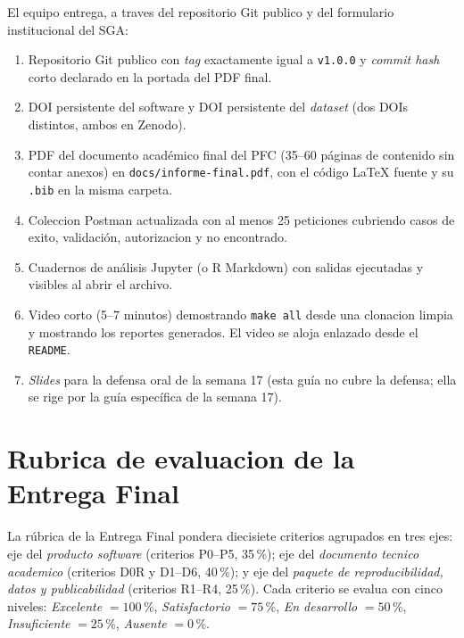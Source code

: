\documentclass[11pt,a4paper]{article}
\begin{document}
El equipo entrega, a traves del repositorio Git publico y del formulario institucional del SGA:

\begin{enumerate}
    \item Repositorio Git publico con \emph{tag} exactamente igual a \texttt{v1.0.0} y \emph{commit hash} corto declarado en la portada del PDF final.
    \item DOI persistente del software y DOI persistente del \emph{dataset} (dos DOIs distintos, ambos en Zenodo).
    \item PDF del documento acad\'{e}mico final del PFC (35--60 p\'{a}ginas de contenido sin contar anexos) en \texttt{docs/informe-final.pdf}, con el c\'{o}digo LaTeX fuente y su \texttt{.bib} en la misma carpeta.
    \item Coleccion Postman actualizada con al menos 25 peticiones cubriendo casos de exito, validaci\'{o}n, autorizacion y no encontrado.
    \item Cuadernos de an\'{a}lisis Jupyter (o R Markdown) con salidas ejecutadas y visibles al abrir el archivo.
    \item Video corto (5--7 minutos) demostrando \texttt{make all} desde una clonacion limpia y mostrando los reportes generados. El video se aloja enlazado desde el \texttt{README}.
    \item \emph{Slides} para la defensa oral de la semana 17 (esta gu\'{i}a no cubre la defensa; ella se rige por la gu\'{i}a espec\'{i}fica de la semana 17).
\end{enumerate}

\section{Rubrica de evaluacion de la Entrega Final}

La r\'{u}brica de la Entrega Final pondera diecisiete criterios agrupados en tres ejes: eje del \emph{producto software} (criterios P0--P5, 35\,\%); eje del \emph{documento tecnico academico} (criterios D0R y D1--D6, 40\,\%); y eje del \emph{paquete de reproducibilidad, datos y publicabilidad} (criterios R1--R4, 25\,\%). Cada criterio se evalua con cinco niveles: \emph{Excelente} $= 100$\,\%, \emph{Satisfactorio} $= 75$\,\%, \emph{En desarrollo} $= 50$\,\%, \emph{Insuficiente} $= 25$\,\%, \emph{Ausente} $= 0$\,\%.
\end{document}
